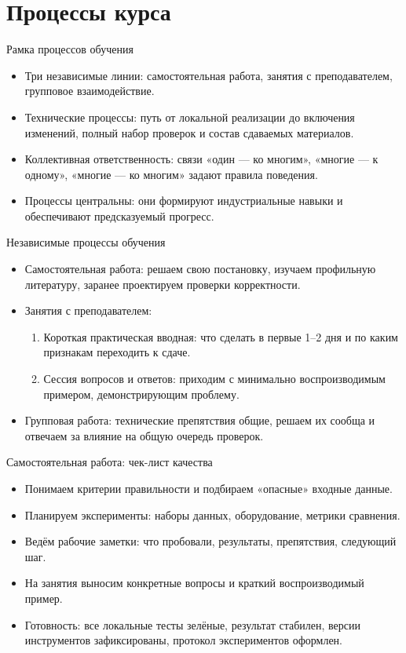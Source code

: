\documentclass{beamer}
\begin{document}
\section{Процессы курса}

\begin{frame}{Рамка процессов обучения}
  \begin{itemize}
    \item Три независимые линии: самостоятельная работа, занятия с преподавателем, групповое взаимодействие.
    \item Технические процессы: путь от локальной реализации до включения изменений, полный набор проверок и состав сдаваемых материалов.
    \item Коллективная ответственность: связи «один — ко многим», «многие — к одному», «многие — ко многим» задают правила поведения.
    \item Процессы центральны: они формируют индустриальные навыки и обеспечивают предсказуемый прогресс.
  \end{itemize}
\end{frame}

\begin{frame}{Независимые процессы обучения}
  \begin{itemize}
    \item Самостоятельная работа: решаем свою постановку, изучаем профильную литературу, заранее проектируем проверки корректности.
    \item Занятия с преподавателем:
      \begin{enumerate}[label=\arabic*.]
        \item Короткая практическая вводная: что сделать в первые 1--2 дня и по каким признакам переходить к сдаче.
        \item Сессия вопросов и ответов: приходим с минимально воспроизводимым примером, демонстрирующим проблему.
      \end{enumerate}
    \item Групповая работа: технические препятствия общие, решаем их сообща и отвечаем за влияние на общую очередь проверок.
  \end{itemize}
\end{frame}

\begin{frame}{Самостоятельная работа: чек-лист качества}
  \begin{itemize}
    \item Понимаем критерии правильности и подбираем «опасные» входные данные.
    \item Планируем эксперименты: наборы данных, оборудование, метрики сравнения.
    \item Ведём рабочие заметки: что пробовали, результаты, препятствия, следующий шаг.
    \item На занятия выносим конкретные вопросы и краткий воспроизводимый пример.
    \item Готовность: все локальные тесты зелёные, результат стабилен, версии инструментов зафиксированы, протокол экспериментов оформлен.
  \end{itemize}
\end{frame}
\end{document}
